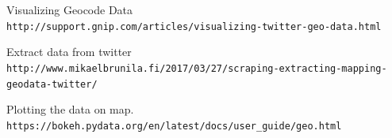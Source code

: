 \documentclass[12pt]{article}
\begin{document}
\newpage
\begin{thebibliography}{9}
Visualizing Geocode Data
\\\texttt{http://support.gnip.com/articles/visualizing-twitter-geo-data.html}
 
Extract data from twitter
\\\texttt{http://www.mikaelbrunila.fi/2017/03/27/scraping-extracting-mapping-geodata-twitter/}
 
Plotting the data on map.
\\\texttt{https://bokeh.pydata.org/en/latest/docs/user\_guide/geo.html}
\end{thebibliography}
\end{document}
